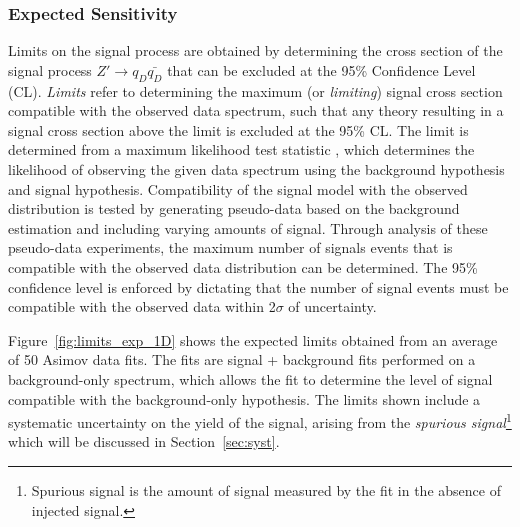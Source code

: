 \begin{figure}[!htbp]
{%
    \label{fig:siginj_asimov}}
\end{figure}

\clearpage
\subsubsection{Expected Sensitivity}
\label{subsec:fit_expsens}

Limits on the signal process are obtained by determining the cross section of the signal process $Z'\rightarrow q_D \bar{q_D}$ that can be excluded at the 95\% Confidence Level (CL). 
\textit{Limits} refer to determining the maximum (or \textit{limiting}) signal cross section compatible with the observed data spectrum, such that any theory resulting in a signal cross section above the limit is excluded at the 95\% CL. 
The limit is determined from a maximum likelihood test statistic \cite{likelihood}, which determines the likelihood of observing the given data spectrum using the background hypothesis and signal hypothesis.
Compatibility of the signal model with the observed distribution is tested by generating pseudo-data based on the background estimation and including varying amounts of signal.
Through analysis of these pseudo-data experiments, the maximum number of signals events that is compatible with the observed data distribution can be determined.
The 95\% confidence level is enforced by dictating that the number of signal events must be compatible with the observed data within 2$\sigma$ of uncertainty.

Figure~\ref{fig:limits_exp_1D} shows the expected limits obtained from an average of 50 Asimov data fits. 
The fits are signal + background fits performed on a background-only spectrum, which allows the fit to determine the level of signal compatible with the background-only hypothesis.
The limits shown include a systematic uncertainty on the yield of the signal, arising from the \textit{spurious signal}\footnote{Spurious signal is the amount of signal measured by the fit in the absence of injected signal.} which will be discussed in Section~\ref{sec:syst}.

